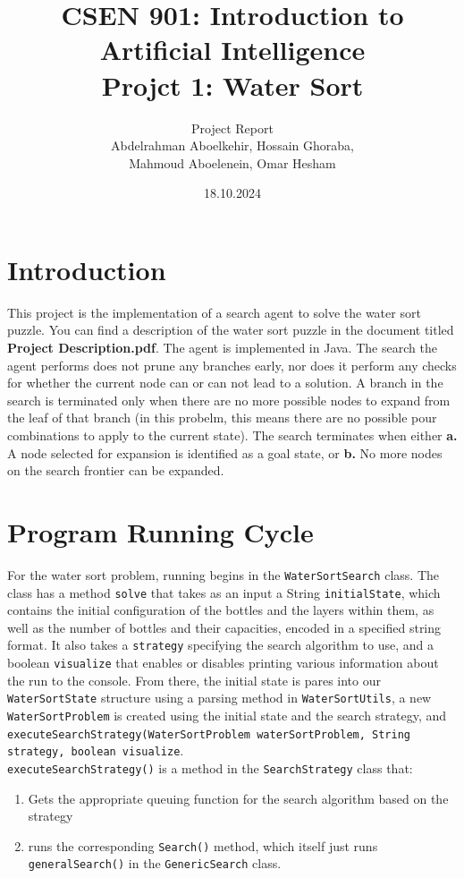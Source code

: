 \documentclass{article}
\title{CSEN 901: Introduction to Artificial Intelligence \\Projct 1: Water Sort}
\author{Project Report \vspace{24pt} \\ Abdelrahman Aboelkehir, Hossain Ghoraba, \\ Mahmoud Aboelenein, Omar Hesham}
\date{18.10.2024}
\begin{document}
\maketitle

\section{Introduction}
This project is the implementation of a search agent to solve the water sort puzzle. You can find a description of the water sort puzzle in the document titled \textbf{Project Description.pdf}. The agent is implemented in Java. The search the agent performs does not prune any branches early, nor does it perform any checks for whether the current node can or can not lead to a solution. A branch in the search is terminated only when there are no more possible nodes to expand from the leaf of that branch (in this probelm, this means there are no possible pour combinations to apply to the current state). The search terminates when either \textbf{a.} A node selected for expansion is identified as a goal state, or \textbf{b.} No more nodes on the search frontier can be expanded.


\section{Program Running Cycle}

For the water sort problem, running begins in the \texttt{WaterSortSearch} class. The class has a method \texttt{solve} that takes as an input a String \texttt{initialState}, which contains the initial configuration of the bottles and the layers within them, as well as the number of bottles and their capacities, encoded in a specified string format. It also takes a \texttt{strategy} specifying the search algorithm to use, and a boolean \texttt{visualize} that enables or disables printing various information about the run to the console. From there, the initial state is pares into our \texttt{WaterSortState} structure using a parsing method in \texttt{WaterSortUtils}, a new \texttt{WaterSortProblem} is created using the initial state and the search strategy, and \texttt{executeSearchStrategy(WaterSortProblem waterSortProblem, String strategy, boolean visualize}. \\

\texttt{executeSearchStrategy()} is a method in the \texttt{SearchStrategy} class that:

\begin{enumerate}
\item Gets the appropriate queuing function for the search algorithm based on the strategy
\item runs the corresponding \texttt{Search()} method, which itself just runs \texttt{generalSearch()} in the \texttt{GenericSearch} class.
\end{enumerate}
\end{document}

